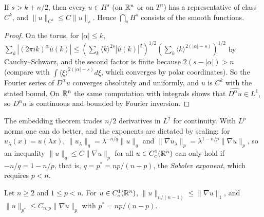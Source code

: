 \begin{theorem}\label{distributions:theorem-sobolev-embedding}
If $s > k + n/2$, then every $u \in H^s$ (on $\mathbb{R}^n$ or on $T^n$) has a representative of class $C^k$, and $\|u\|_{C^k} \leq C\|u\|_s$. Hence $\bigcap_sH^s$ consists of the smooth functions.
\end{theorem}

\begin{proof}
On the torus, for $|\alpha| \leq k$,
$\sum_k|(2\pi ik)^\alpha\hat u(k)| \leq \left(\sum_k\langle k\rangle^{2s}|\hat u(k)|^2\right)^{1/2}\left(\sum_k\langle k\rangle^{2(|\alpha| - s)}\right)^{1/2}$ by Cauchy--Schwarz, and the second factor is
finite because $2(s - |\alpha|) > n$ (compare with $\int\langle\xi\rangle^{2(|\alpha|-s)}d\xi$, which converges by polar coordinates). So the Fourier series of $D^\alpha u$ converges absolutely and
uniformly, and $u$ is $C^k$ with the stated bound. On $\mathbb{R}^n$ the same computation with integrals shows that $\widehat{D^\alpha u} \in L^1$, so $D^\alpha u$ is continuous and bounded by Fourier inversion.
\end{proof}

The embedding theorem trades $n/2$ derivatives in $L^2$ for continuity. With $L^p$ norms one can do better, and the exponents are dictated by scaling: for $u_\lambda(x) = u(\lambda x)$,
$\|u_\lambda\|_q = \lambda^{-n/q}\|u\|_q$ and $\|\nabla u_\lambda\|_p = \lambda^{1 - n/p}\|\nabla u\|_p$, so an inequality $\|u\|_q \leq C\|\nabla u\|_p$ for all $u \in C_c^1(\mathbb{R}^n)$ can only hold if
$-n/q = 1 - n/p$, that is, $q = p^* = np/(n - p)$, the \emph{Sobolev exponent}, which requires $p < n$.

\begin{theorem}\label{distributions:theorem-gns}
Let $n \geq 2$ and $1 \leq p < n$. For $u \in C_c^1(\mathbb{R}^n)$, $\|u\|_{n/(n-1)} \leq \|\nabla u\|_1$, and $\|u\|_{p^*} \leq C_{n,p}\|\nabla u\|_p$ with $p^* = np/(n - p)$.
\end{theorem}

